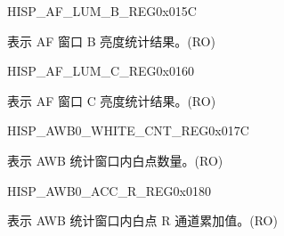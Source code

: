 \begin{register}{H}{ISP\_AF\_LUM\_B\_REG}{0x015C}\label{regdesc:ISPAFLUMBREG}
%
%
\regnewline%
\begin{regdesc}\begin{reglist}
\label{fielddesc:ISPAFLUMB}\item [ISP\_AF\_LUMB] 表示 AF 窗口 B 亮度统计结果。(RO)
\end{reglist}\end{regdesc}
\end{register}


\begin{register}{H}{ISP\_AF\_LUM\_C\_REG}{0x0160}\label{regdesc:ISPAFLUMCREG}
%
%
\regnewline%
\begin{regdesc}\begin{reglist}
\label{fielddesc:ISPAFLUMC}\item [ISP\_AF\_LUMC] 表示 AF 窗口 C 亮度统计结果。(RO)
\end{reglist}\end{regdesc}
\end{register}


\begin{register}{H}{ISP\_AWB0\_WHITE\_CNT\_REG}{0x017C}\label{regdesc:ISPAWB0WHITECNTREG}
%
%
\regnewline%
\begin{regdesc}\begin{reglist}
\label{fielddesc:ISPAWB0WHITECNT}\item [ISP\_AWB0\_WHITE\_CNT] 表示 AWB 统计窗口内白点数量。(RO)
\end{reglist}\end{regdesc}
\end{register}


\begin{register}{H}{ISP\_AWB0\_ACC\_R\_REG}{0x0180}\label{regdesc:ISPAWB0ACCRREG}
%
\regnewline%
\begin{regdesc}\begin{reglist}
\label{fielddesc:ISPAWB0ACCR}\item [ISP\_AWB0\_ACC\_R] 表示 AWB 统计窗口内白点 R 通道累加值。(RO)
\end{reglist}\end{regdesc}
\end{register}


